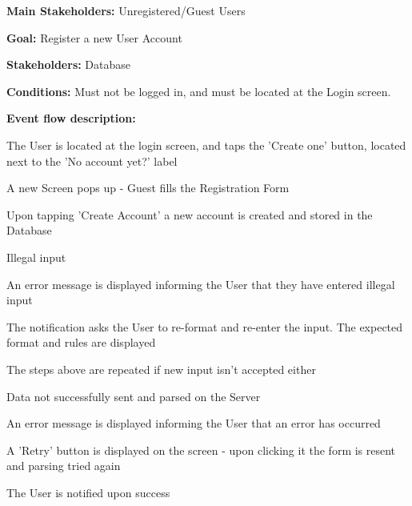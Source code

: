				\noindent {}
				\begin{packed_item}
					\item \textbf{Main Stakeholders:} Unregistered/Guest Users
					\item \textbf{Goal:} Register a new User Account
					\item \textbf{Stakeholders:} Database
					\item \textbf{Conditions:} Must not be logged in, and must be located at the Login screen.
					\item \textbf{Event flow description: }
					\begin{packed_enum}
						\item The User is located at the login screen, and taps the 'Create one' button, located next to the 'No account yet?' label
						\item A new Screen pops up - Guest fills the Registration Form
						\item Upon tapping 'Create Account' a new account is created and stored in the Database
					\end{packed_enum}
				
					\begin{packed_item}
						\item[2.a] Illegal input
						\item[] \begin{packed_enum}
							\item An error message is displayed informing the User that they have entered illegal input
							\item The notification asks the User to re-format and re-enter the input. The expected format and rules are displayed
							\item The steps above are repeated if new input isn't accepted either
						\end{packed_enum}
						
						\item[3.a] Data not successfully sent and parsed on the Server
						\item[] \begin{packed_enum}
							\item An error message is displayed informing the User that an error has occurred
							\item A 'Retry' button is displayed on the screen - upon clicking it the form is resent and parsing tried again
							\item The User is notified upon success
						\end{packed_enum}
						
					\end{packed_item}
					
				\end{packed_item}
			
